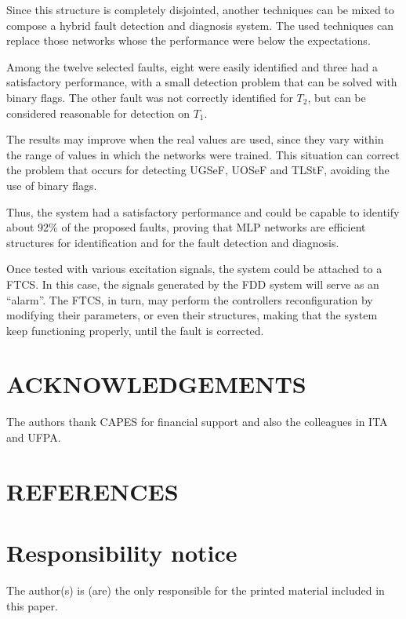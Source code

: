 \documentclass[10pt,fleqn,a4paper]{article}
\begin{document}
Since this structure is completely disjointed, another techniques can be mixed
to compose a hybrid fault detection and diagnosis system. The used techniques
can replace those networks whose the performance were below the expectations.

Among the twelve selected faults, eight were easily identified and three had a
satisfactory performance, with a small detection problem that can be solved
with binary flags. The other fault was not correctly identified for $T_2$,
but can be considered reasonable for detection on $T_1$.

The results may improve when the real values are used, since they vary within
the range of values in which the networks were trained. This situation can
correct the problem that occurs for detecting UGSeF, UOSeF and TLStF, avoiding
the use of binary flags.

Thus, the system had a satisfactory performance and could be capable to identify
about 92\% of the proposed faults, proving that MLP networks are efficient
structures for identification and for the fault detection and diagnosis.

Once tested with various excitation signals, the system could be attached to a
FTCS. In this case, the signals generated by the FDD system will serve as an
``alarm''. The FTCS, in turn, may perform the controllers reconfiguration by
modifying their parameters, or even their structures, making that the system
keep functioning properly, until the fault is corrected.

\section{ACKNOWLEDGEMENTS}
The authors thank CAPES for financial support and also the colleagues in ITA and
UFPA.

\section{REFERENCES}


\renewcommand{\refname}{}


\section{Responsibility notice}
The author(s) is (are) the only responsible for the printed material included in
this paper.
\end{document}
